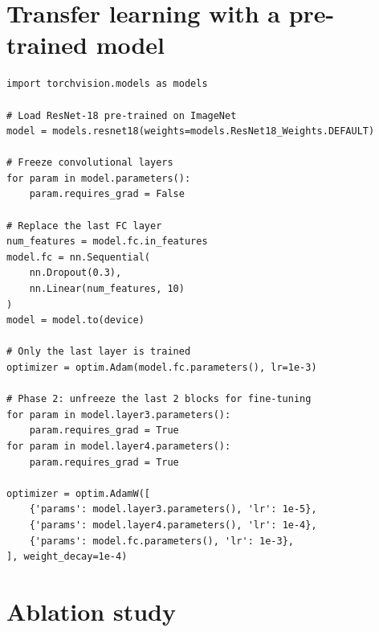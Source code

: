 \section{Transfer learning with a pre-trained model}
\label{sec:transfer-code}

\begin{codeblock}[title=\textbf{Fine-tuning a pre-trained ResNet-18}]
\begin{verbatim}
import torchvision.models as models

# Load ResNet-18 pre-trained on ImageNet
model = models.resnet18(weights=models.ResNet18_Weights.DEFAULT)

# Freeze convolutional layers
for param in model.parameters():
    param.requires_grad = False

# Replace the last FC layer
num_features = model.fc.in_features
model.fc = nn.Sequential(
    nn.Dropout(0.3),
    nn.Linear(num_features, 10)
)
model = model.to(device)

# Only the last layer is trained
optimizer = optim.Adam(model.fc.parameters(), lr=1e-3)

# Phase 2: unfreeze the last 2 blocks for fine-tuning
for param in model.layer3.parameters():
    param.requires_grad = True
for param in model.layer4.parameters():
    param.requires_grad = True

optimizer = optim.AdamW([
    {'params': model.layer3.parameters(), 'lr': 1e-5},
    {'params': model.layer4.parameters(), 'lr': 1e-4},
    {'params': model.fc.parameters(), 'lr': 1e-3},
], weight_decay=1e-4)
\end{verbatim}
\end{codeblock}

\section{Ablation study}
\label{sec:cnn-ablation}

